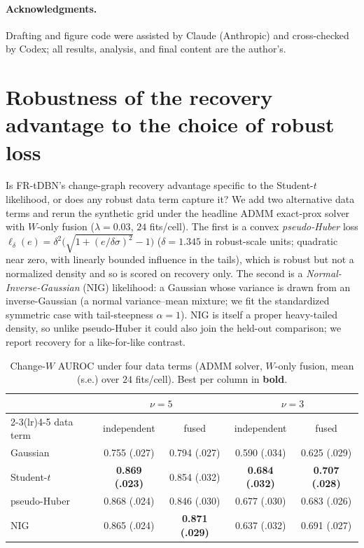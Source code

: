 \documentclass{article}
\begin{document}
\paragraph{Acknowledgments.} Drafting and figure code were assisted by Claude
(Anthropic) and cross-checked by Codex; all results, analysis, and final content are
the author's.




\appendix

\section{Robustness of the recovery advantage to the choice of robust loss}
\label{app:huber}

Is FR-tDBN's change-graph recovery advantage specific to the Student-$t$ likelihood, or
does any robust data term capture it? We add two alternative data terms and rerun the
synthetic grid under the headline ADMM exact-prox solver with $W$-only fusion
($\lambda{=}0.03$, $24$ fits/cell). The first is a convex \emph{pseudo-Huber} loss
$\ell_\delta(e)=\delta^2\big(\sqrt{1+(e/\delta\sigma)^2}-1\big)$ ($\delta{=}1.345$ in
robust-scale units; quadratic near zero, with linearly bounded influence in the tails),
which is robust but not a normalized density and so is scored on recovery only. The
second is a \emph{Normal-Inverse-Gaussian} (NIG) likelihood: a Gaussian whose variance
is drawn from an inverse-Gaussian (a normal variance--mean mixture; we fit the
standardized symmetric case with tail-steepness $\alpha{=}1$). NIG is itself a proper
heavy-tailed density, so unlike pseudo-Huber it could also join the held-out comparison;
we report recovery for a like-for-like contrast.

\begin{table}[h]
\centering
\small
\begin{tabular}{lcccc}
\toprule
& \multicolumn{2}{c}{$\nu=5$} & \multicolumn{2}{c}{$\nu=3$}\\
\cmidrule(lr){2-3}\cmidrule(lr){4-5}
data term & independent & fused & independent & fused\\
\midrule
Gaussian      & 0.755 (.027)          & 0.794 (.027)          & 0.590 (.034)          & 0.625 (.029)\\
Student-$t$   & \textbf{0.869 (.023)} & 0.854 (.032)          & \textbf{0.684 (.032)} & \textbf{0.707 (.028)}\\
pseudo-Huber  & 0.868 (.024)          & 0.846 (.030)          & 0.677 (.030)          & 0.683 (.026)\\
NIG           & 0.865 (.024)          & \textbf{0.871 (.029)} & 0.637 (.032)          & 0.691 (.027)\\
\bottomrule
\end{tabular}
\caption{Change-$W$ AUROC under four data terms (ADMM solver, $W$-only fusion, mean
(s.e.) over $24$ fits/cell). Best per column in \textbf{bold}.}
\label{tab:huber}
\end{table}
\end{document}
